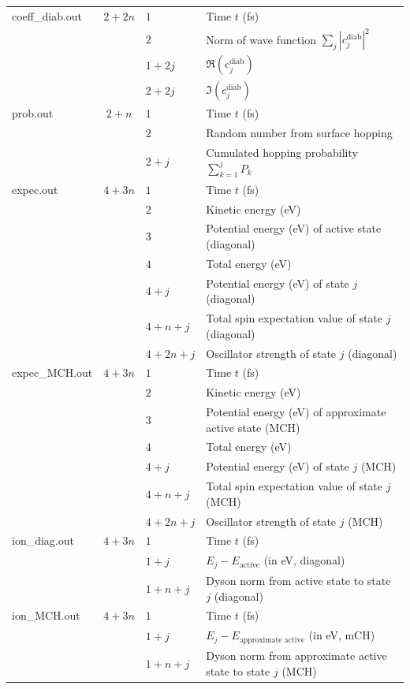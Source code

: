 \documentclass[a4paper,10pt,DIV=15,openany]{scrbook}
\begin{document}
\begin{table}[tbp]
\begin{tabular}{>{\ttfamily}lcll}
    coeff\_diab.out       &$2+2n$
      &$1$ &Time $t$ (fs)\\
      &&$2$ &Norm of wave function $\sum_j |c_j^{\text{diab}}|^2$\\
      &&$1+2j$ &$\Re (c_j^{\text{diab}})$\\
      &&$2+2j$ &$\Im (c_j^{\text{diab}})$\\
    prob.out       &$2+n$
      &$1$ &Time $t$ (fs)\\
      &&$2$ &Random number from surface hopping\\
      &&$2+j$ &Cumulated hopping probability $\sum_{k=1}^j P_k$\\
    expec.out      &$4+3n$
      &$1$ &Time $t$ (fs)\\
      &&$2$ &Kinetic energy (eV)\\
      &&$3$ &Potential energy (eV) of active state (diagonal)\\
      &&$4$ &Total energy (eV)\\
      &&$4+j$ &Potential energy (eV) of state $j$ (diagonal)\\
      &&$4+n+j$ &Total spin expectation value of state $j$ (diagonal)\\
      &&$4+2n+j$ &Oscillator strength of state $j$ (diagonal)\\
    expec\_MCH.out      &$4+3n$
      &$1$ &Time $t$ (fs)\\
      &&$2$ &Kinetic energy (eV)\\
      &&$3$ &Potential energy (eV) of approximate active state (MCH)\\
      &&$4$ &Total energy (eV)\\
      &&$4+j$ &Potential energy (eV) of state $j$ (MCH)\\
      &&$4+n+j$ &Total spin expectation value of state $j$ (MCH)\\
      &&$4+2n+j$ &Oscillator strength of state $j$ (MCH)\\
    ion\_diag.out      &$4+3n$
      &$1$ &Time $t$ (fs)\\
      &&$1+j$ &$E_j-E_\text{active}$ (in eV, diagonal)\\
      &&$1+n+j$ &Dyson norm from active state to state $j$ (diagonal)\\
    ion\_MCH.out      &$4+3n$
      &$1$ &Time $t$ (fs)\\
      &&$1+j$ &$E_j-E_\text{approximate active}$ (in eV, mCH)\\
      &&$1+n+j$ &Dyson norm from approximate active state to state $j$ (MCH)\\
    \hline
  \end{tabular}
\end{table}
\end{document}
